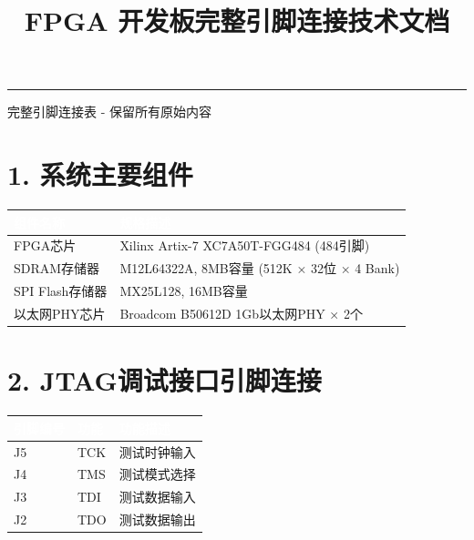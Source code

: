 \documentclass[12pt]{article}
\begin{document}
\title{\textbf{FPGA 开发板完整引脚连接技术文档}}
\author{}
\date{}
\maketitle

\begin{center}
    \color{tableheader}\rule{\textwidth}{1.5pt}
    \vspace{5pt}
    \textcolor{tableheader}{\small 完整引脚连接表 - 保留所有原始内容}
\end{center}

\section*{1. 系统主要组件}
\begin{table}[h]
    \centering
    \footnotesize
    \begin{tabular}{|L{4cm}|L{10cm}|}
    \hline
    \textcolor{white}{\bfseries 组件名称} & \textcolor{white}{\bfseries 规格描述} \\
    \hline
    FPGA芯片 & Xilinx Artix-7 XC7A50T-FGG484 (484引脚) \\
    \hline
    SDRAM存储器 & M12L64322A, 8MB容量 (512K × 32位 × 4 Bank) \\
    \hline
    SPI Flash存储器 & MX25L128, 16MB容量 \\
    \hline
    以太网PHY芯片 & Broadcom B50612D 1Gb以太网PHY × 2个 \\
    \hline
    \end{tabular}
\end{table}

\section*{2. JTAG调试接口引脚连接}
\begin{table}[h]
    \centering
    \footnotesize
    \begin{tabular}{|C{2cm}|C{2cm}|C{8cm}|}
    \hline
    \textcolor{white}{\bfseries 引脚编号} & \textcolor{white}{\bfseries 功能} & \textcolor{white}{\bfseries 功能描述} \\
    \hline
    J5 & TCK & 测试时钟输入 \\
    \hline
    J4 & TMS & 测试模式选择 \\
    \hline
    J3 & TDI & 测试数据输入 \\
    \hline
    J2 & TDO & 测试数据输出 \\
    \hline
    \end{tabular}
\end{table}
\end{document}
